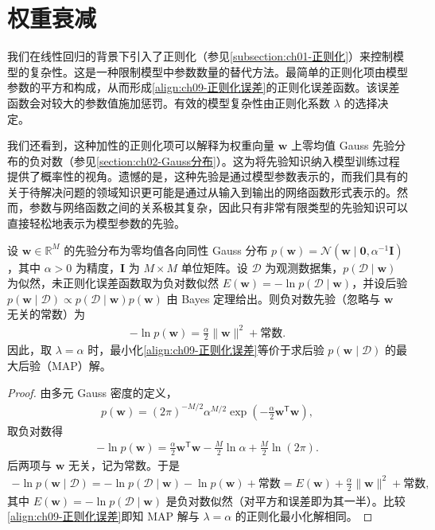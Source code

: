 \documentclass[../../main.tex]{subfiles}
\begin{document}
\section{权重衰减}\label{section:ch09-权重衰减}

我们在线性回归的背景下引入了正则化（参见\cref{subsection:ch01-正则化}）来控制模型的复杂性。这是一种限制模型中参数数量的替代方法。最简单的正则化项由模型参数的平方和构成，从而形成\eqref{align:ch09-正则化误差}的正则化误差函数。该误差函数会对较大的参数值施加惩罚。有效的模型复杂性由正则化系数 $\lambda$ 的选择决定。

我们还看到，这种加性的正则化项可以解释为权重向量 $\boldsymbol{w}$ 上零均值 Gauss 先验分布的负对数（参见\cref{section:ch02-Gauss分布}）。这为将先验知识纳入模型训练过程提供了概率性的视角。遗憾的是，这种先验是通过模型参数表示的，而我们具有的关于待解决问题的领域知识更可能是通过从输入到输出的网络函数形式表示的。然而，参数与网络函数之间的关系极其复杂，因此只有非常有限类型的先验知识可以直接轻松地表示为模型参数的先验。

\begin{proposition}\label{proposition:ch09-Gauss先验}
设 $\boldsymbol{w}\in\mathbb{R}^{M}$ 的先验分布为零均值各向同性 Gauss 分布 $p(\boldsymbol{w})=\mathcal{N}(\boldsymbol{w}\mid\boldsymbol{0},\alpha^{-1}\boldsymbol{I})$，其中 $\alpha>0$ 为精度，$\boldsymbol{I}$ 为 $M\times M$ 单位矩阵。设 $\mathcal{D}$ 为观测数据集，$p(\mathcal{D}\mid\boldsymbol{w})$ 为似然，未正则化误差函数取为负对数似然 $E(\boldsymbol{w})=-\ln p(\mathcal{D}\mid\boldsymbol{w})$，并设后验 $p(\boldsymbol{w}\mid\mathcal{D})\propto p(\mathcal{D}\mid\boldsymbol{w})p(\boldsymbol{w})$ 由 Bayes 定理给出。则负对数先验（忽略与 $\boldsymbol{w}$ 无关的常数）为
\begin{align*}
-\ln p(\boldsymbol{w})=\frac{\alpha}{2}\|\boldsymbol{w}\|^{2}+\text{常数}.
\end{align*}
因此，取 $\lambda=\alpha$ 时，最小化\eqref{align:ch09-正则化误差}等价于求后验 $p(\boldsymbol{w}\mid\mathcal{D})$ 的最大后验（MAP）解。
\end{proposition}

\begin{proof}
由多元 Gauss 密度的定义，
\begin{align*}
p(\boldsymbol{w})=(2\pi)^{-M/2}\alpha^{M/2}\exp\!\left(-\frac{\alpha}{2}\boldsymbol{w}^{\mathsf T}\boldsymbol{w}\right),
\end{align*}
取负对数得
\begin{align*}
-\ln p(\boldsymbol{w})=\frac{\alpha}{2}\boldsymbol{w}^{\mathsf T}\boldsymbol{w}-\frac{M}{2}\ln\alpha+\frac{M}{2}\ln(2\pi).
\end{align*}
后两项与 $\boldsymbol{w}$ 无关，记为常数。于是
\begin{align*}
-\ln p(\boldsymbol{w}\mid\mathcal{D})=-\ln p(\mathcal{D}\mid\boldsymbol{w})-\ln p(\boldsymbol{w})+\text{常数}=E(\boldsymbol{w})+\frac{\alpha}{2}\|\boldsymbol{w}\|^{2}+\text{常数},
\end{align*}
其中 $E(\boldsymbol{w})=-\ln p(\mathcal{D}\mid\boldsymbol{w})$ 是负对数似然（对平方和误差即为其一半）。比较\eqref{align:ch09-正则化误差}即知 MAP 解与 $\lambda=\alpha$ 的正则化最小化解相同。
\end{proof}
\end{document}
